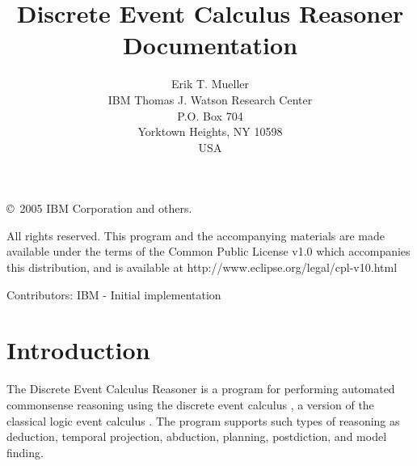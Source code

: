 \documentclass{article}
\begin{document}
\title{Discrete Event Calculus Reasoner \\
Documentation}
\author{Erik T. Mueller \\
IBM Thomas J. Watson Research Center \\
P.O. Box 704 \\
Yorktown Heights, NY 10598 \\
USA}


\maketitle
\sloppy

\copyright\ 2005 IBM Corporation and others.

\noindent
All rights reserved. This program and the accompanying materials
are made available under the terms of the Common Public License v1.0
which accompanies this distribution, and is available at
http://www.eclipse.org/legal/cpl-v10.html

\noindent
Contributors: 
IBM - Initial implementation

\section{Introduction}

The Discrete Event Calculus Reasoner is a program for performing
automated commonsense reasoning using the discrete event calculus
\cite{Mueller:2006}, a version of the classical logic event calculus
\cite{Shanahan:1997,MillerShanahan:2002}. The program supports such
types of reasoning as deduction, temporal projection, abduction,
planning, postdiction, and model finding.
\end{document}
